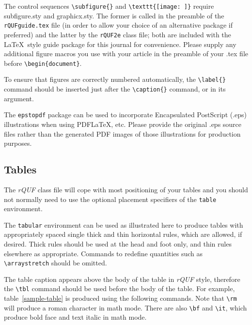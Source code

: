 \documentclass{rQUF2e}
\theoremstyle{plain}
\theoremstyle{definition}
\theoremstyle{remark}
\begin{document}
The control sequences \verb"\subfigure{}" and \verb"\texttt{[image: ]}" require subfigure.sty and graphicx.sty.
The former is called in the preamble of the \texttt{rQUFguide.tex} file (in order to allow your choice of an alternative package if preferred)
and the latter by the \texttt{rQUF2e} class file; both are included with the \LaTeX\ style guide package for this journal for convenience.
Please supply any additional figure macros you use with your article in the preamble of your .tex file before \verb"\begin{document}".

To ensure that figures are correctly numbered automatically, the \verb"\label{}" command should be inserted just
after the \verb"\caption{}" command, or in its argument.

The \texttt{epstopdf} package can be used to incorporate Encapsulated PostScript (.eps) illustrations when using PDF\LaTeX, etc. 
Please provide the original .eps source files rather than the generated PDF images of those illustrations for production purposes.


\subsection{Tables}

The \textit{rQUF} class file will cope with most positioning of your tables and you should not normally need to use the optional
placement specifiers of the \texttt{table} environment.

The \texttt{tabular} environment can be used as illustrated here to produce tables with appropriately spaced single thick and thin
horizontal rules, which are allowed, if desired. Thick rules should be used at the head and foot only, and thin rules elsewhere as appropriate.
Commands to redefine quantities such as \verb"\arraystretch" should be omitted.

The table caption appears above the body of the table in \textit{rQUF} style, therefore the \verb"\tbl" command should be used before the body of the table.
For example, table~\ref{sample-table} is produced using the following commands. Note that \verb"\rm" will produce a roman character in math mode.
There are also \verb"\bf" and \verb"\it", which produce bold face and text italic in math mode.
\end{document}
